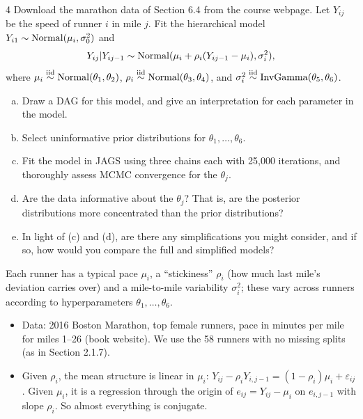 \documentclass[11pt]{article}
\begin{document}
\begin{problem}{4}
Download the marathon data of Section 6.4 from the course webpage. Let $Y_{ij}$ be the speed of runner $i$ in mile $j$. Fit the hierarchical model $Y_{i1}\sim\mathrm{Normal}(\mu_i,\sigma_0^2)$ and
\[
Y_{ij}|Y_{ij-1}\sim\mathrm{Normal}(\mu_i+\rho_i(Y_{ij-1}-\mu_i),\sigma_i^2),
\]
where $\mu_i\stackrel{\text{iid}}{\sim}\mathrm{Normal}(\theta_1,\theta_2)$, $\rho_i\stackrel{\text{iid}}{\sim}\mathrm{Normal}(\theta_3,\theta_4)$, and $\sigma_i^2\stackrel{\text{iid}}{\sim}\mathrm{InvGamma}(\theta_5,\theta_6)$.
\begin{enumerate}[(a)]
\item Draw a DAG for this model, and give an interpretation for each parameter in the model.
\item Select uninformative prior distributions for $\theta_1,\dots,\theta_6$.
\item Fit the model in JAGS using three chains each with 25,000 iterations, and thoroughly assess MCMC convergence for the $\theta_j$.
\item Are the data informative about the $\theta_j$? That is, are the posterior distributions more concentrated than the prior distributions?
\item In light of (c) and (d), are there any simplifications you might consider, and if so, how would you compare the full and simplified models?
\end{enumerate}
\end{problem}

\begin{restate}
Each runner has a typical pace $\mu_i$, a ``stickiness'' $\rho_i$ (how much last mile's deviation carries over) and a mile-to-mile variability $\sigma_i^2$; these vary across runners according to hyperparameters $\theta_1,\dots,\theta_6$.
\end{restate}

\begin{recall}
\begin{itemize}
\item Data: 2016 Boston Marathon, top female runners, pace in minutes per mile for miles 1--26 (book website). We use the 58 runners with no missing splits (as in Section 2.1.7).
\item Given $\rho_i$, the mean structure is linear in $\mu_i$: $Y_{ij}-\rho_iY_{i,j-1}=(1-\rho_i)\mu_i+\varepsilon_{ij}$. Given $\mu_i$, it is a regression through the origin of $e_{ij}=Y_{ij}-\mu_i$ on $e_{i,j-1}$ with slope $\rho_i$. So almost everything is conjugate.
\end{itemize}
\end{recall}
\end{document}
